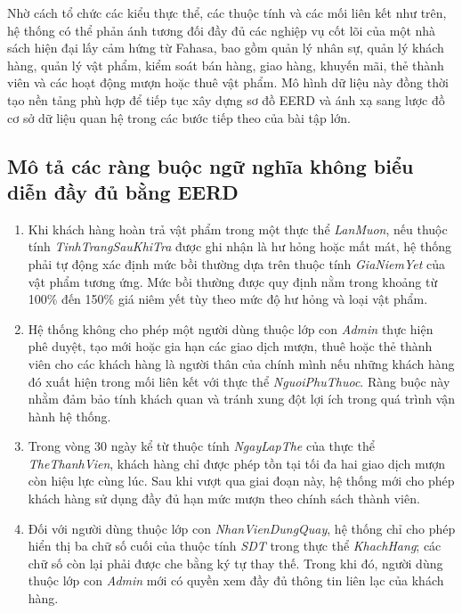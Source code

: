Nhờ cách tổ chức các kiểu thực thể, các thuộc tính và các mối liên kết như trên, hệ thống có thể phản ánh tương đối đầy đủ các nghiệp vụ cốt lõi của một nhà sách hiện đại lấy cảm hứng từ Fahasa, bao gồm quản lý nhân sự, quản lý khách hàng, quản lý vật phẩm, kiểm soát bán hàng, giao hàng, khuyến mãi, thẻ thành viên và các hoạt động mượn hoặc thuê vật phẩm. Mô hình dữ liệu này đồng thời tạo nền tảng phù hợp để tiếp tục xây dựng sơ đồ EERD và ánh xạ sang lược đồ cơ sở dữ liệu quan hệ trong các bước tiếp theo của bài tập lớn.

\subsection{Mô tả các ràng buộc ngữ nghĩa không biểu diễn đầy đủ bằng EERD}

\begin{enumerate}
    \item Khi khách hàng hoàn trả vật phẩm trong một thực thể \textit{LanMuon}, nếu thuộc tính \textit{TinhTrangSauKhiTra} được ghi nhận là hư hỏng hoặc mất mát, hệ thống phải tự động xác định mức bồi thường dựa trên thuộc tính \textit{GiaNiemYet} của vật phẩm tương ứng. Mức bồi thường được quy định nằm trong khoảng từ 100\% đến 150\% giá niêm yết tùy theo mức độ hư hỏng và loại vật phẩm.

    \item Hệ thống không cho phép một người dùng thuộc lớp con \textit{Admin} thực hiện phê duyệt, tạo mới hoặc gia hạn các giao dịch mượn, thuê hoặc thẻ thành viên cho các khách hàng là người thân của chính mình nếu những khách hàng đó xuất hiện trong mối liên kết với thực thể \textit{NguoiPhuThuoc}. Ràng buộc này nhằm đảm bảo tính khách quan và tránh xung đột lợi ích trong quá trình vận hành hệ thống.

    \item Trong vòng 30 ngày kể từ thuộc tính \textit{NgayLapThe} của thực thể \textit{TheThanhVien}, khách hàng chỉ được phép tồn tại tối đa hai giao dịch mượn còn hiệu lực cùng lúc. Sau khi vượt qua giai đoạn này, hệ thống mới cho phép khách hàng sử dụng đầy đủ hạn mức mượn theo chính sách thành viên.

    \item Đối với người dùng thuộc lớp con \textit{NhanVienDungQuay}, hệ thống chỉ cho phép hiển thị ba chữ số cuối của thuộc tính \textit{SDT} trong thực thể \textit{KhachHang}; các chữ số còn lại phải được che bằng ký tự thay thế. Trong khi đó, người dùng thuộc lớp con \textit{Admin} mới có quyền xem đầy đủ thông tin liên lạc của khách hàng.


\end{enumerate}
